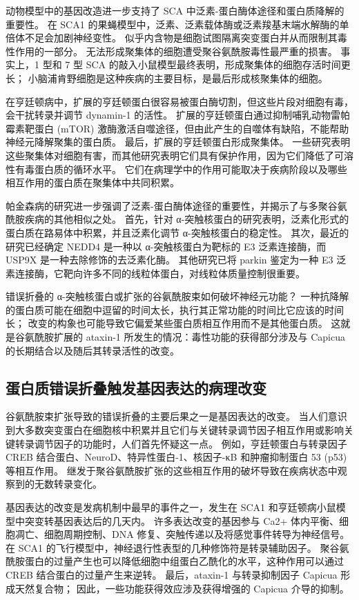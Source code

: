 动物模型中的基因改造进一步支持了 SCA 中泛素-蛋白酶体途径和蛋白质降解的重要性。 在 SCA1 的果蝇模型中，泛素、泛素载体酶或泛素羧基末端水解酶的单倍体不足会加剧神经变性。 似乎内含物是细胞试图隔离突变蛋白并从而限制其毒性作用的一部分。 无法形成聚集体的细胞遭受聚谷氨酰胺毒性最严重的损害。 事实上，1 型和 7 型 SCA 的敲入小鼠模型最终表明，形成聚集体的细胞存活时间更长； 小脑浦肯野细胞是这种疾病的主要目标，是最后形成核聚集体的细胞。

在亨廷顿病中，扩展的亨廷顿蛋白很容易被蛋白酶切割，但这些片段对细胞有毒，会干扰转录并调节 dynamin-1 的活性。 扩展的亨廷顿蛋白通过抑制哺乳动物雷帕霉素靶蛋白 (mTOR) 激酶激活自噬途径，但由此产生的自噬体有缺陷，不能帮助神经元降解聚集的蛋白质。 最后，扩展的亨廷顿蛋白形成聚集体。 一些研究表明这些聚集体对细胞有害，而其他研究表明它们具有保护作用，因为它们降低了可溶性有毒蛋白质的循环水平。 它们在病理学中的作用可能取决于疾病阶段以及哪些相互作用的蛋白质在聚集体中共同积累。

帕金森病的研究进一步强调了泛素-蛋白酶体途径的重要性，并揭示了与多聚谷氨酰胺疾病的其他相似之处。 首先，针对 α-突触核蛋白的研究表明，泛素化形式的蛋白质在路易体中积累，并且泛素化调节 α-突触核蛋白的稳定性。 其次，最近的研究已经确定 NEDD4 是一种以 α-突触核蛋白为靶标的 E3 泛素连接酶，而 USP9X 是一种去除修饰的去泛素化酶。 其他研究已将 parkin 鉴定为一种 E3 泛素连接酶，它靶向许多不同的线粒体蛋白，对线粒体质量控制很重要。

错误折叠的 α-突触核蛋白或扩张的谷氨酰胺束如何破坏神经元功能？ 一种抗降解的蛋白质可能在细胞中逗留的时间太长，执行其正常功能的时间比它应该的时间长； 改变的构象也可能导致它偏爱某些蛋白质相互作用而不是其他蛋白质。 这就是谷氨酰胺扩展的 ataxin-1 所发生的情况：毒性功能的获得部分涉及与 Capicua 的长期结合以及随后其转录活性的改变。

\subsection{蛋白质错误折叠触发基因表达的病理改变}
谷氨酰胺束扩张导致的错误折叠的主要后果之一是基因表达的改变。 当人们意识到大多数突变蛋白在细胞核中积累并且它们与关键转录调节因子相互作用或影响关键转录调节因子的功能时，人们首先怀疑这一点。 例如，亨廷顿蛋白与转录因子 CREB 结合蛋白、NeuroD、特异性蛋白-1、核因子-κB 和肿瘤抑制蛋白 53 (p53) 等相互作用。 继发于聚谷氨酰胺扩张的这些相互作用的破坏导致在疾病状态中观察到的无数转录变化。

基因表达的改变是发病机制中最早的事件之一，发生在 SCA1 和亨廷顿病小鼠模型中突变转基因表达后的几天内。 许多表达改变的基因参与 Ca2+ 体内平衡、细胞凋亡、细胞周期控制、DNA 修复、突触传递以及将感觉事件转导为神经信号。 在 SCA1 的飞行模型中，神经退行性表型的几种修饰符是转录辅助因子。 聚谷氨酰胺蛋白的过量产生也可以降低细胞中组蛋白乙酰化的水平，这种作用可以通过 CREB 结合蛋白的过量产生来逆转。 最后，ataxin-1 与转录抑制因子 Capicua 形成天然复合物； 因此，一些功能获得效应涉及获得增强的 Capicua 介导的抑制。

